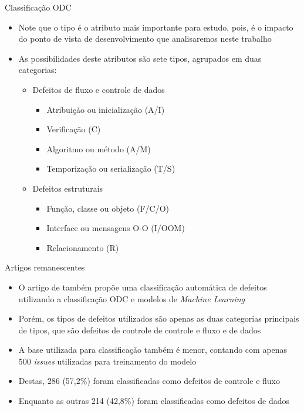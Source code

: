 \documentclass[brazilian]{beamer}
\begin{document}
\begin{frame}{Classificação ODC}
    \begin{itemize}
        \item Note que o tipo é o atributo mais importante para estudo, pois, é o impacto do ponto de vista de desenvolvimento que analisaremos neste trabalho
        \item As possibilidades deste atributos são sete tipos, agrupados em duas categorias:
        \begin{itemize}
            \item Defeitos de fluxo e controle de dados
            \begin{itemize}
                \item Atribuição ou inicialização (A/I)
                \item Verificação (C)
                \item Algoritmo ou método (A/M)
                \item Temporização ou serialização (T/S)
            \end{itemize}
            \item Defeitos estruturais
            \begin{itemize}
                \item Função, classe ou objeto (F/C/O)
                \item Interface ou mensagens O-O (I/OOM)
                \item Relacionamento (R)
            \end{itemize}
        \end{itemize}
    \end{itemize}
\end{frame}

\begin{frame}{Artigos remanescentes}
    \begin{itemize}
        \item O artigo de \cite{automatic_defect_categorization} também propõe uma classificação automática de defeitos utilizando a classificação ODC e modelos de \emph{Machine Learning}
        \item Porém, os tipos de defeitos utilizados são apenas as duas categorias principais de tipos, que são defeitos de controle de controle e fluxo e de dados
        \item A base utilizada para classificação também é menor, contando com apenas 500 \textit{issues} utilizadas para treinamento do modelo
        \item Destas, 286 (57,2\%) foram classificadas como defeitos de controle e fluxo
        \item Enquanto as outras 214 (42,8\%) foram classificadas como defeitos de dados 
    \end{itemize}
\end{frame}
\end{document}
